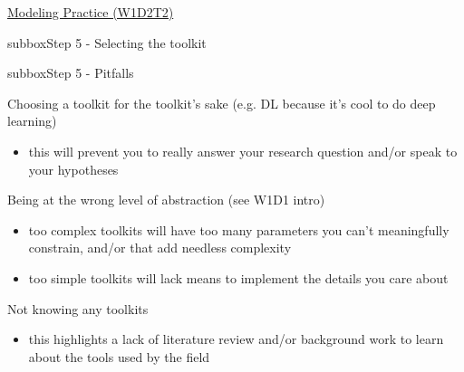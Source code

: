 \begin{textbox}{\href{https://compneuro.neuromatch.io/tutorials/W1D2_ModelingPractice/W1D2_Intro.html}{Modeling Practice  (W1D2T2)} }
\begin{subbox}{subbox}{Step 5 - Selecting the toolkit}
  \end{subbox}
\begin{subbox}{subbox}{Step 5 - Pitfalls }
\scriptsize


Choosing a toolkit for the toolkit's sake (e.g. DL because it's cool to do deep learning)
\begin{itemize}
    \item this will prevent you to really answer your research question and/or speak to your hypotheses\end{itemize}

Being at the wrong level of abstraction (see W1D1 intro)
\begin{itemize}
    \item too complex toolkits will have too many parameters you can't meaningfully constrain, and/or that add needless complexity
 \item too simple toolkits will lack means to implement the details you care about\end{itemize}
  
Not knowing any toolkits
\begin{itemize}
    \item this highlights a lack of literature review and/or background work to learn about the tools used by the field\end{itemize}
\end{subbox}
 
 
\end{textbox}
